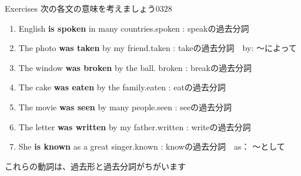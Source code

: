 \documentclass[aspectratio=169,xcolor={dvipsnames,table}]{beamer}
\newcommand{\myaudio}[1]{\href{#1}{\faVolumeUp}}
\begin{document}
\begin{frame}[plain]{Exercises}
  次の各文の意味を考えましょう\hfill{\tiny 0328}\,{\scriptsize \myaudio{./audio/051_passive_03.mp3}}


  \begin{enumerate}
    \item English \textbf{is spoken} in many countries.\hfill{}{\scriptsize spoken  : speakの過去分詞}
    \item The photo \textbf{was taken} by my friend.\hfill{}{\scriptsize taken  : takeの過去分詞　by: 〜によって}
    \item The window \textbf{was broken} by the ball.\hfill{} {\scriptsize broken  : breakの過去分詞}
    \item The cake \textbf{was eaten} by the family.\hfill{}{\scriptsize eaten  : eatの過去分詞}
    \item The movie \textbf{was seen} by many people.\hfill{}{\scriptsize seen  : seeの過去分詞}
    \item The letter \textbf{was written} by my father.\hfill{}{\scriptsize written  : writeの過去分詞}
    \item She \textbf{is known} as a great singer.\hfill{}{\scriptsize known  : knowの過去分詞　as： 〜として}
  \end{enumerate}

  \pause

  \hfill{}{\small これらの動詞は、過去形と過去分詞がちがいます}

\end{frame}
\end{document}
